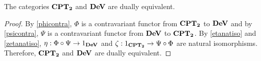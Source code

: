 \begin{theorem}
	The categories \( \bf{CPT}_\mathbf{2} \) and \( \bf{DeV} \) are dually equivalent.
\end{theorem}
\begin{proof}
	By \ref{phicontra}, \( \Phi \) is a contravariant functor from \( \bf{CPT}_\mathbf{2} \) to \( \bf{DeV} \) and by \ref{psicontra}, \( \Psi \) is a contravariant functor from \( \bf{DeV} \) to \( \bf{CPT}_\mathbf{2} \).  By \ref{etanatiso} and \ref{zetanatiso}, \( \eta: \Phi \circ \Psi \to 1_{\bf{DeV}} \) and \( \zeta: 1_{\bf{CPT}_\mathbf{2}} \to \Psi \circ \Phi \) are natural isomorphisms.  Therefore, \( \bf{CPT}_\mathbf{2} \) and \( \bf{DeV} \) are dually equivalent.
\end{proof}
